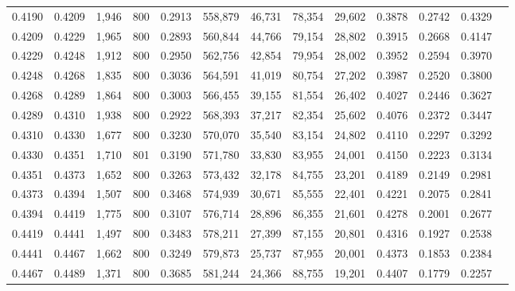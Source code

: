 \begin{tabular}{rrrrrrrrrrrrr}
0.4190 & 0.4209 &  1,946 &   800 &                                     0.2913 & 558,879 &  46,731 &  78,354 &  29,602 & 0.3878 & 0.2742 & 0.4329 \\
0.4209 & 0.4229 &  1,965 &   800 &                                     0.2893 & 560,844 &  44,766 &  79,154 &  28,802 & 0.3915 & 0.2668 & 0.4147 \\
0.4229 & 0.4248 &  1,912 &   800 &                                     0.2950 & 562,756 &  42,854 &  79,954 &  28,002 & 0.3952 & 0.2594 & 0.3970 \\
0.4248 & 0.4268 &  1,835 &   800 &                                     0.3036 & 564,591 &  41,019 &  80,754 &  27,202 & 0.3987 & 0.2520 & 0.3800 \\
0.4268 & 0.4289 &  1,864 &   800 &                                     0.3003 & 566,455 &  39,155 &  81,554 &  26,402 & 0.4027 & 0.2446 & 0.3627 \\
0.4289 & 0.4310 &  1,938 &   800 &                                     0.2922 & 568,393 &  37,217 &  82,354 &  25,602 & 0.4076 & 0.2372 & 0.3447 \\
0.4310 & 0.4330 &  1,677 &   800 &                                     0.3230 & 570,070 &  35,540 &  83,154 &  24,802 & 0.4110 & 0.2297 & 0.3292 \\
0.4330 & 0.4351 &  1,710 &   801 &                                     0.3190 & 571,780 &  33,830 &  83,955 &  24,001 & 0.4150 & 0.2223 & 0.3134 \\
0.4351 & 0.4373 &  1,652 &   800 &                                     0.3263 & 573,432 &  32,178 &  84,755 &  23,201 & 0.4189 & 0.2149 & 0.2981 \\
0.4373 & 0.4394 &  1,507 &   800 &                                     0.3468 & 574,939 &  30,671 &  85,555 &  22,401 & 0.4221 & 0.2075 & 0.2841 \\
0.4394 & 0.4419 &  1,775 &   800 &                                     0.3107 & 576,714 &  28,896 &  86,355 &  21,601 & 0.4278 & 0.2001 & 0.2677 \\
0.4419 & 0.4441 &  1,497 &   800 &                                     0.3483 & 578,211 &  27,399 &  87,155 &  20,801 & 0.4316 & 0.1927 & 0.2538 \\
0.4441 & 0.4467 &  1,662 &   800 &                                     0.3249 & 579,873 &  25,737 &  87,955 &  20,001 & 0.4373 & 0.1853 & 0.2384 \\
0.4467 & 0.4489 &  1,371 &   800 &                                     0.3685 & 581,244 &  24,366 &  88,755 &  19,201 & 0.4407 & 0.1779 & 0.2257 \\

\end{tabular}
